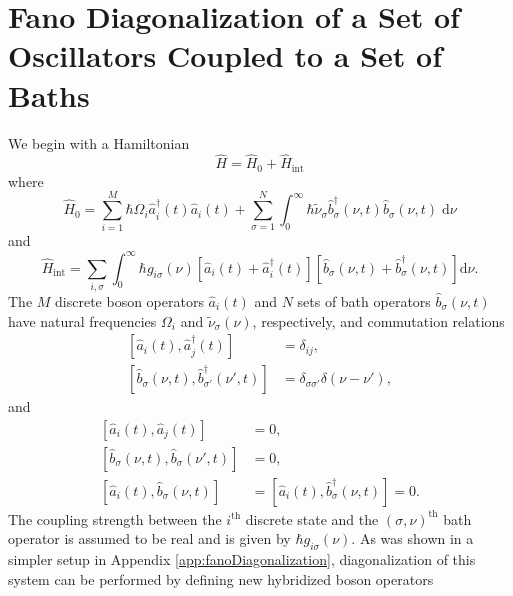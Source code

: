 
\section{Fano Diagonalization of a Set of Oscillators Coupled to a Set of Baths}\label{app:fanoDiagonalizationManyModes}

We begin with a Hamiltonian
\begin{equation}\label{eq:HmanyModes}
\hat{H} = \hat{H}_0 + \hat{H}_\mathrm{int}
\end{equation}
where 
\begin{equation}
\hat{H}_0 = \sum_{i = 1}^{M}\hbar\Omega_i\hat{a}_{i}^\dagger(t)\hat{a}_{i}(t) + \sum_{\sigma = 1}^N\int_0^\infty\hbar\tilde{\nu}_\sigma\hat{b}_\sigma^\dagger(\nu,t)\hat{b}_\sigma(\nu,t)\;\mathrm{d}\nu
\end{equation}
and
\begin{equation}
\hat{H}_\mathrm{int} = \sum_{i,\sigma}\int_0^\infty\hbar g_{i \sigma}(\nu)\left[\hat{a}_{i}(t) + \hat{a}_{i}^\dagger(t)\right]\left[\hat{b}_\sigma(\nu,t) + \hat{b}_\sigma^\dagger(\nu,t)\right]\mathrm{d}\nu.
\end{equation}
The $M$ discrete boson operators $\hat{a}_i(t)$ and $N$ sets of bath operators $\hat{b}_\sigma(\nu,t)$ have natural frequencies $\Omega_i$ and $\tilde{\nu}_\sigma(\nu)$, respectively, and commutation relations
\begin{equation}
\begin{split}
\left[\hat{a}_i(t),\hat{a}_{j}^\dagger(t)\right] &= \delta_{ij},\\
\left[\hat{b}_\sigma(\nu,t),\hat{b}_{\sigma'}^\dagger(\nu',t)\right] &= \delta_{\sigma\sigma'}\delta(\nu - \nu'),
\end{split}
\end{equation}
and
\begin{equation}
\begin{split}
\left[\hat{a}_i(t),\hat{a}_{j}(t)\right] &= 0,\\
\left[\hat{b}_\sigma(\nu,t),\hat{b}_\sigma(\nu',t)\right] &= 0,\\
\left[\hat{a}_i(t),\hat{b}_\sigma(\nu,t)\right] &= \left[\hat{a}_i(t),\hat{b}_\sigma^\dagger(\nu,t)\right] = 0.
\end{split}
\end{equation}
The coupling strength between the $i^\mathrm{th}$ discrete state and the $(\sigma,\nu)^\mathrm{th}$ bath operator is assumed to be real and is given by $\hbar g_{i\sigma}(\nu)$. As was shown in a simpler setup in Appendix \ref{app:fanoDiagonalization}, diagonalization of this system can be performed by defining new hybridized boson operators
